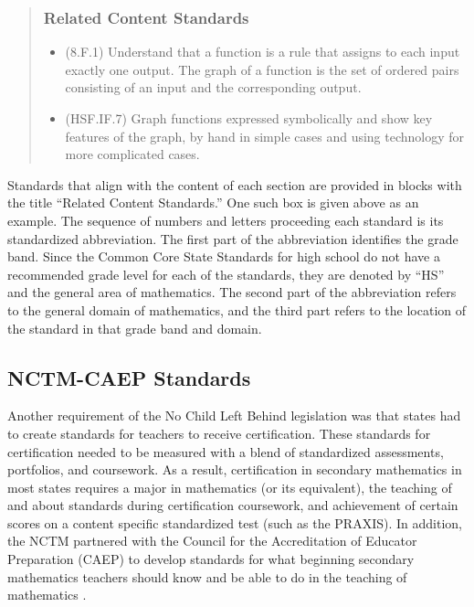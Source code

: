 \documentclass[
]{book}
\providecommand{\tightlist}{%
  \setlength{\itemsep}{0pt}\setlength{\parskip}{0pt}}
\theoremstyle{definition}
\theoremstyle{definition}
\theoremstyle{definition}
\theoremstyle{remark}
\begin{document}
\begin{quote}
\hypertarget{related-content-standards}{%
\subsubsection*{Related Content Standards}\label{related-content-standards}}

\begin{itemize}
\tightlist
\item
  (8.F.1) Understand that a function is a rule that assigns to each input exactly one output. The graph of a function is the set of ordered pairs consisting of an input and the corresponding output.
\item
  (HSF.IF.7) Graph functions expressed symbolically and show key features of the graph, by hand in simple cases and using technology for more complicated cases.
\end{itemize}
\end{quote}

Standards that align with the content of each section are provided in blocks with the title ``Related Content Standards.'' One such box is given above as an example. The sequence of numbers and letters proceeding each standard is its standardized abbreviation. The first part of the abbreviation identifies the grade band. Since the Common Core State Standards for high school do not have a recommended grade level for each of the standards, they are denoted by ``HS'' and the general area of mathematics. The second part of the abbreviation refers to the general domain of mathematics, and the third part refers to the location of the standard in that grade band and domain.

\hypertarget{nctm-caep-standards}{%
\subsection{NCTM-CAEP Standards}\label{nctm-caep-standards}}

Another requirement of the No Child Left Behind legislation was that states had to create standards for teachers to receive certification. These standards for certification needed to be measured with a blend of standardized assessments, portfolios, and coursework. As a result, certification in secondary mathematics in most states requires a major in mathematics (or its equivalent), the teaching of and about standards during certification coursework, and achievement of certain scores on a content specific standardized test (such as the PRAXIS). In addition, the NCTM partnered with the Council for the Accreditation of Educator Preparation (CAEP) to develop standards for what beginning secondary mathematics teachers should know and be able to do in the teaching of mathematics \citep{CAEP}.
\end{document}
